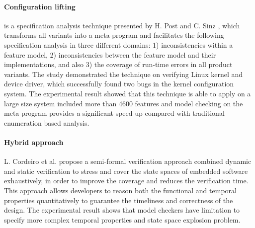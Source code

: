 

\paragraph{Configuration lifting} is a specification analysis technique presented by
H. Post and C. Sinz \cite{4639338}, which transforms all variants into a meta-program and facilitates the following specification analysis in three different domains: 1) inconsistencies within a feature model, 2) inconsistencies between the feature model and their implementations, and also 3) the coverage of run-time errors in all product variants. The study demonstrated the technique on verifying Linux kernel and device driver, which successfully found two bugs in the kernel configuration system. The experimental result showed that this technique is able to apply on a large size system included more than 4600 features and model checking on the meta-program provides a significant speed-up compared with traditional enumeration based analysis.

\paragraph{Hybrid approach} L. Cordeiro et al. \cite{5066674} propose a semi-formal verification approach combined dynamic and static verification to stress and cover the state spaces of embedded software exhaustively, in order to improve the coverage and reduces the verification time. This approach allows developers to reason both the functional and temporal properties quantitatively to guarantee the timeliness and correctness of the design. The experimental result shows that model checkers have  limitation to specify more complex temporal properties and state space explosion problem.


